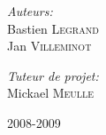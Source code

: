 \begin{titlepage}
		\vfill
		\begin{minipage}{0.5\textwidth}
			\begin{flushleft} \large
				\emph{Auteurs:}\\
				 Bastien \textsc{Legrand}\\
				 Jan \textsc{Villeminot}

			\end{flushleft}
		\end{minipage}
		\begin{minipage}{0.45\textwidth}
			\begin{flushright} \large
				\emph{Tuteur de projet:} \\
				Mickael \textsc{Meulle}\\
			\end{flushright}
		\end{minipage}
		
		\vfil
		\begin{center}
			{\large 2008-2009}
		\end{center}
	\end{titlepage}
